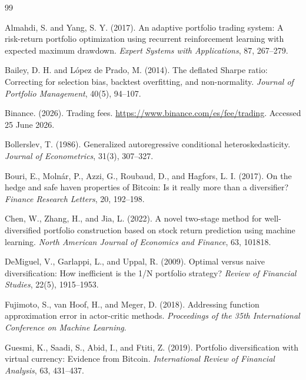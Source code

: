 \documentclass[12pt]{article}
\begin{document}
\newpage
{}
{}
\begin{thebibliography}{99}

 Almahdi, S. and Yang, S. Y. (2017). An adaptive portfolio trading system: A risk-return portfolio optimization using recurrent reinforcement learning with expected maximum drawdown. \emph{Expert Systems with Applications}, 87, 267--279.

 Bailey, D. H. and López de Prado, M. (2014). The deflated Sharpe ratio: Correcting for selection bias, backtest overfitting, and non-normality. \emph{Journal of Portfolio Management}, 40(5), 94--107.

 Binance. (2026). Trading fees. \url{https://www.binance.com/es/fee/trading}. Accessed 25 June 2026.

 Bollerslev, T. (1986). Generalized autoregressive conditional heteroskedasticity. \emph{Journal of Econometrics}, 31(3), 307--327.

 Bouri, E., Molnár, P., Azzi, G., Roubaud, D., and Hagfors, L. I. (2017). On the hedge and safe haven properties of Bitcoin: Is it really more than a diversifier? \emph{Finance Research Letters}, 20, 192--198.

 Chen, W., Zhang, H., and Jia, L. (2022). A novel two-stage method for well-diversified portfolio construction based on stock return prediction using machine learning. \emph{North American Journal of Economics and Finance}, 63, 101818.

 DeMiguel, V., Garlappi, L., and Uppal, R. (2009). Optimal versus naive diversification: How inefficient is the 1/N portfolio strategy? \emph{Review of Financial Studies}, 22(5), 1915--1953.

 Fujimoto, S., van Hoof, H., and Meger, D. (2018). Addressing function approximation error in actor-critic methods. \emph{Proceedings of the 35th International Conference on Machine Learning}.

 Guesmi, K., Saadi, S., Abid, I., and Ftiti, Z. (2019). Portfolio diversification with virtual currency: Evidence from Bitcoin. \emph{International Review of Financial Analysis}, 63, 431--437.


\end{thebibliography}
\end{document}
